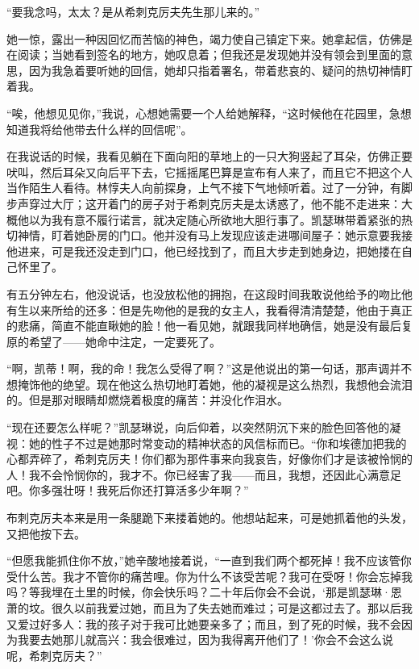 \par “要我念吗，太太？是从希刺克厉夫先生那儿来的。”
\par 她一惊，露出一种因回忆而苦恼的神色，竭力使自己镇定下来。她拿起信，仿佛是在阅读；当她看到签名的地方，她叹息着；但我还是发现她并没有领会到里面的意思，因为我急着要听她的回信，她却只指着署名，带着悲哀的、疑问的热切神情盯着我。
\par “唉，他想见见你，”我说，心想她需要一个人给她解释，“这时候他在花园里，急想知道我将给他带去什么样的回信呢”。
\par 在我说话的时候，我看见躺在下面向阳的草地上的一只大狗竖起了耳朵，仿佛正要吠叫，然后耳朵又向后平下去，它摇摇尾巴算是宣布有人来了，而且它不把这个人当作陌生人看待。林惇夫人向前探身，上气不接下气地倾听着。过了一分钟，有脚步声穿过大厅；这开着门的房子对于希刺克厉夫是太诱惑了，他不能不走进来：大概他以为我有意不履行诺言，就决定随心所欲地大胆行事了。凯瑟琳带着紧张的热切神情，盯着她卧房的门口。他并没有马上发现应该走进哪间屋子：她示意要我接他进来，可是我还没走到门口，他已经找到了，而且大步走到她身边，把她搂在自己怀里了。
\par 有五分钟左右，他没说话，也没放松他的拥抱，在这段时间我敢说他给予的吻比他有生以来所给的还多：但是先吻他的是我的女主人，我看得清清楚楚，他由于真正的悲痛，简直不能直瞅她的脸！他一看见她，就跟我同样地确信，她是没有最后复原的希望了——她命中注定，一定要死了。
\par “啊，凯蒂！啊，我的命！我怎么受得了啊？”这是他说出的第一句话，那声调并不想掩饰他的绝望。现在他这么热切地盯着她，他的凝视是这么热烈，我想他会流泪的。但是那对眼睛却燃烧着极度的痛苦：并没化作泪水。
\par “现在还要怎么样呢？”凯瑟琳说，向后仰着，以突然阴沉下来的脸色回答他的凝视：她的性子不过是她那时常变动的精神状态的风信标而已。“你和埃德加把我的心都弄碎了，希刺克厉夫！你们都为那件事来向我哀告，好像你们才是该被怜悯的人！我不会怜悯你的，我才不。你已经害了我——而且，我想，还因此心满意足吧。你多强壮呀！我死后你还打算活多少年啊？”
\par 布刺克厉夫本来是用一条腿跪下来搂着她的。他想站起来，可是她抓着他的头发，又把他按下去。
\par “但愿我能抓住你不放，”她辛酸地接着说，“一直到我们两个都死掉！我不应该管你受什么苦。我才不管你的痛苦哩。你为什么不该受苦呢？我可在受呀！你会忘掉我吗？等我埋在土里的时候，你会快乐吗？二十年后你会不会说，‘那是凯瑟琳·恩萧的坟。很久以前我爱过她，而且为了失去她而难过；可是这都过去了。那以后我又爱过好多人：我的孩子对于我可比她要亲多了；而且，到了死的时候，我不会因为我要去她那儿就高兴：我会很难过，因为我得离开他们了！’你会不会这么说呢，希刺克厉夫？”
